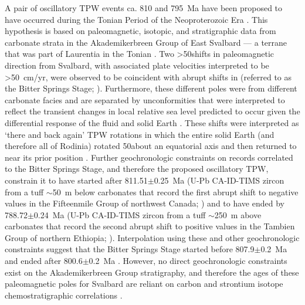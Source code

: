 A pair of oscillatory TPW events ca. 810 and 795~Ma have been proposed to have occurred during the Tonian Period of the Neoproterozoic Era \citep{Maloof2006a}. This hypothesis is based on paleomagnetic, isotopic, and stratigraphic data from carbonate strata in the Akademikerbreen Group of East Svalbard --- a terrane that was part of Laurentia in the Tonian \citep{Maloof2006a}. Two \textgreater50\degrees shifts in paleomagnetic direction from Svalbard, with associated plate velocities interpreted to be \textgreater50~cm/yr, were observed to be coincident with abrupt shifts in \dC (referred to as the Bitter Springs Stage; \citealp{Maloof2006a}). Furthermore, these different poles were from different carbonate facies and are separated by unconformities that were interpreted to reflect the transient changes in local relative sea level predicted to occur given the differential response of the fluid and solid Earth \citep{Mound1999a, Maloof2006a}. These shifts were interpreted as `there and back again' TPW rotations in which the entire solid Earth (and therefore all of Rodinia) rotated 50\degrees about an equatorial axis and then returned to near its prior position \citep{Maloof2006a}. Further geochronologic constraints on \dC records correlated to the Bitter Springs Stage, and therefore the proposed oscillatory TPW, constrain it to have started after 811.51$\pm$0.25~Ma (U-Pb CA-ID-TIMS zircon from a tuff $\sim$50~m below carbonates that record the first abrupt shift to negative \dC values in the Fifteenmile Group of northwest Canada; \citealp{Macdonald2010a}) and to have ended by 788.72$\pm$0.24~Ma (U-Pb CA-ID-TIMS zircon from a tuff $\sim$250~m above carbonates that record the second abrupt shift to positive \dC values in the Tambien Group of northern Ethiopia; \citealp{Swanson-Hysell2015a, Park2020a}). Interpolation using these and other geochronologic constraints suggest that the Bitter Springs Stage started before 807.9$\pm$0.2~Ma and ended after 800.6$\pm$0.2~Ma \citep{Swanson-Hysell2015a}. However, no direct geochronologic constraints exist on the Akademikerbreen Group stratigraphy, and therefore the ages of these paleomagnetic poles for Svalbard are reliant on carbon and strontium isotope chemostratigraphic correlations \citep{Halverson2007a}.

